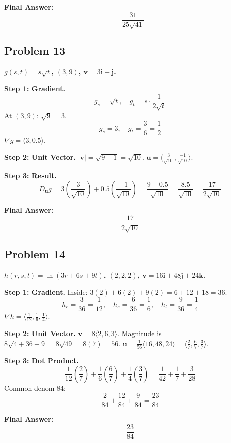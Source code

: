 \documentclass{article}
\begin{document}
\textbf{Final Answer:}
\[ \boxed{-\frac{31}{25\sqrt{41}}} \]

\hrulefill

\subsection*{Problem 13}
\textbf{$g(s, t) = s\sqrt{t}$, $(3, 9)$, $\mathbf{v} = 3\mathbf{i} - \mathbf{j}$.}

\textbf{Step 1: Gradient.}
\[ g_s = \sqrt{t}, \quad g_t = s \cdot \frac{1}{2\sqrt{t}} \]
At $(3, 9)$: $\sqrt{9}=3$.
\[ g_s = 3, \quad g_t = \frac{3}{6} = \frac{1}{2} \]
$\nabla g = \langle 3, 0.5 \rangle$.

\textbf{Step 2: Unit Vector.}
$|\mathbf{v}| = \sqrt{9+1} = \sqrt{10}$. $\mathbf{u} = \langle \frac{3}{\sqrt{10}}, \frac{-1}{\sqrt{10}} \rangle$.

\textbf{Step 3: Result.}
\[ D_{\mathbf{u}}g = 3\left(\frac{3}{\sqrt{10}}\right) + 0.5\left(\frac{-1}{\sqrt{10}}\right) = \frac{9 - 0.5}{\sqrt{10}} = \frac{8.5}{\sqrt{10}} = \frac{17}{2\sqrt{10}} \]

\textbf{Final Answer:}
\[ \boxed{\frac{17}{2\sqrt{10}}} \]

\hrulefill

\subsection*{Problem 14}
\textbf{$h(r, s, t) = \ln(3r + 6s + 9t)$, $(2, 2, 2)$, $\mathbf{v} = 16\mathbf{i} + 48\mathbf{j} + 24\mathbf{k}$.}

\textbf{Step 1: Gradient.}
Inside: $3(2)+6(2)+9(2) = 6+12+18 = 36$.
\[ h_r = \frac{3}{36} = \frac{1}{12}, \quad h_s = \frac{6}{36} = \frac{1}{6}, \quad h_t = \frac{9}{36} = \frac{1}{4} \]
$\nabla h = \langle \frac{1}{12}, \frac{1}{6}, \frac{1}{4} \rangle$.

\textbf{Step 2: Unit Vector.}
$\mathbf{v} = 8\langle 2, 6, 3 \rangle$. Magnitude is $8\sqrt{4+36+9} = 8\sqrt{49} = 8(7) = 56$.
$\mathbf{u} = \frac{1}{56}\langle 16, 48, 24 \rangle = \langle \frac{2}{7}, \frac{6}{7}, \frac{3}{7} \rangle$.

\textbf{Step 3: Dot Product.}
\[ \frac{1}{12}(\frac{2}{7}) + \frac{1}{6}(\frac{6}{7}) + \frac{1}{4}(\frac{3}{7}) = \frac{1}{42} + \frac{1}{7} + \frac{3}{28} \]
Common denom 84:
\[ \frac{2}{84} + \frac{12}{84} + \frac{9}{84} = \frac{23}{84} \]

\textbf{Final Answer:}
\[ \boxed{\frac{23}{84}} \]

\hrulefill
\end{document}

